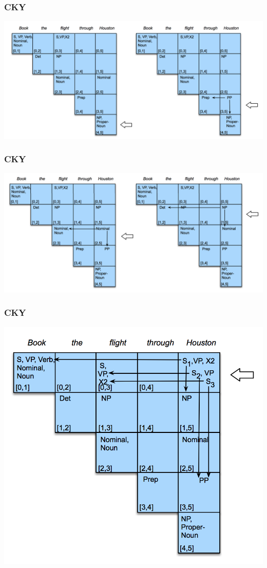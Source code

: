 \documentclass{beamer}
\begin{document}
\begin{frame}
\frametitle{CKY}
\includegraphics[width=\textwidth]{figures/cky2}
\end{frame}

\begin{frame}
\frametitle{CKY}
\includegraphics[width=\textwidth]{figures/cky3}
\end{frame}

\begin{frame}
\frametitle{CKY}
\includegraphics[width=\textwidth]{figures/cky4}
\end{frame}
\end{document}
